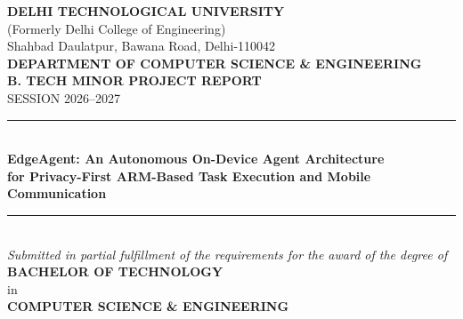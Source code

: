 \documentclass[12pt,a4paper,oneside]{report}
\begin{document}
    \begin{titlepage}
    \thispagestyle{empty}
    \begin{singlespace}
    \begin{center}
        {\large \textbf{DELHI TECHNOLOGICAL UNIVERSITY}}\\[0.15cm]
        {\normalsize (Formerly Delhi College of Engineering)}\\[0.15cm]
        {\normalsize Shahbad Daulatpur, Bawana Road, Delhi-110042}\\[0.4cm]

        {\large \textbf{DEPARTMENT OF COMPUTER SCIENCE \& ENGINEERING}}\\[0.5cm]

        {\Large \textbf{B. TECH MINOR PROJECT REPORT}}\\[0.2cm]
        {\normalsize SESSION 2026--2027}\\[0.4cm]

    \rule{\linewidth}{1.2pt}\\[0.35cm]
    {\Large \textbf{EdgeAgent: An Autonomous On-Device Agent Architecture}}\\[0.2cm]
    {\Large \textbf{for Privacy-First ARM-Based Task Execution and Mobile Communication}}\\[0.25cm]
    \rule{\linewidth}{1.2pt}\\[0.45cm]

        \textit{Submitted in partial fulfillment of the requirements for the award of the degree of}\\[0.2cm]
        {\large \textbf{BACHELOR OF TECHNOLOGY}}\\[0.15cm]
        {\normalsize in}\\[0.15cm]
        {\large \textbf{COMPUTER SCIENCE \& ENGINEERING}}\\[0.5cm]


\end{center}
\end{singlespace}
\end{titlepage}
\end{document}
